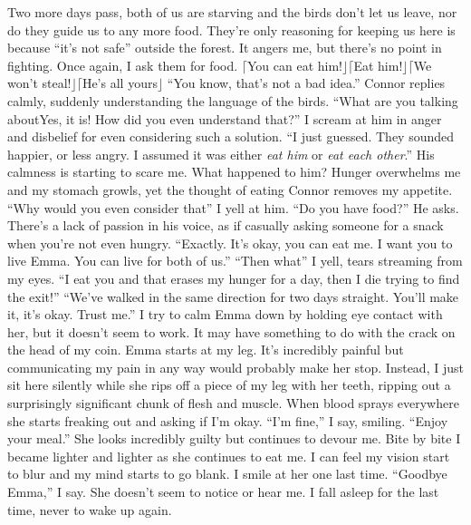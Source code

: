 \documentclass[openany, 12pt]{book}
\newcommand\bird[1]{$\lceil$#1$\rfloor$\tab}
\newcommand\tab[1][1cm]{\hspace*{#1}}
\begin{document}
\newline
\tab
Two more days pass, both of us are starving and the birds don’t let us leave, nor do they guide us to any more food. They’re only reasoning for keeping us here is because ``it’s not safe'' outside the forest. It angers me, but there’s no point in fighting. Once again, I ask them for food.
\newline
\bird{You can eat him!}\bird{Eat him!}\bird{We won't steal!}\bird{He's all yours}
\newline
``You know, that’s not a bad idea.'' Connor replies calmly, suddenly understanding the language of the birds.
\newline
\tab
``What are you talking about\textinterrobang Yes, it is! How did you even understand that?'' I scream at him in anger and disbelief for even considering such a solution.
\newline
\tab
``I just guessed. They sounded happier, or less angry. I assumed it was either \textit{eat him} or \textit{eat each other}.'' His calmness is starting to scare me. What happened to him?
\newline
\tab
Hunger overwhelms me and my stomach growls, yet the thought of eating Connor removes my appetite. ``Why would you even consider that\textinterrobang'' I yell at him.
\newline
\tab
``Do you have food?'' He asks. There’s a lack of passion in his voice, as if casually asking someone for a snack when you’re not even hungry. ``Exactly. It’s okay, you can eat me. I want you to live Emma. You can live for both of us.''
\newline
\tab
``Then what\textinterrobang'' I yell, tears streaming from my eyes. ``I eat you and that erases my hunger for a day, then I die trying to find the exit!''
\newline
\tab
``We’ve walked in the same direction for two days straight. You’ll make it, it’s okay. Trust me.''
\newline
\newline
\tab
I try to calm Emma down by holding eye contact with her, but it doesn’t seem to work. It may have something to do with the crack on the head of my coin. Emma starts at my leg. It’s incredibly painful but communicating my pain in any way would probably make her stop. Instead, I just sit here silently while she rips off a piece of my leg with her teeth, ripping out a surprisingly significant chunk of flesh and muscle. When blood sprays everywhere she starts freaking out and asking if I’m okay. ``I’m fine,'' I say, smiling. ``Enjoy your meal.'' She looks incredibly guilty but continues to devour me. Bite by bite I became lighter and lighter as she continues to eat me. I can feel my vision start to blur and my mind starts to go blank. I smile at her one last time. ``Goodbye Emma,'' I say. She doesn’t seem to notice or hear me. I fall asleep for the last time, never to wake up again.
\end{document}
